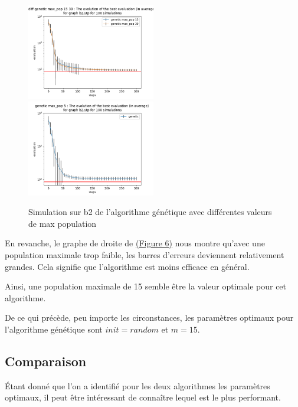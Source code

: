 \documentclass[11pt,french]{report}
\begin{document}
        \begin{figure}
          \includegraphics[width=0.5\textwidth]{best_b2_evaluation_diff genetic max_pop 15 30.png}
          \includegraphics[width=0.5\textwidth]{best_b2_evaluation_genetic max_pop 5.png}
          \caption{Simulation sur b2 de l'algorithme génétique avec différentes valeurs de max population}
          \label{Figure6}
        \end{figure}

        En revanche, le graphe de droite de \hyperref[Figure6]{(Figure 6)} nous montre qu'avec une population maximale trop faible, les barres d'erreurs deviennent relativement grandes. Cela signifie que l'algorithme est moins efficace en général.

        Ainsi, une population maximale de 15 semble être la valeur optimale pour cet algorithme.


        De ce qui précède, peu importe les circonstances, les paramètres optimaux pour l'algorithme génétique sont $init = random$ et $\hyperref[sélection]{m} = 15$.

        \subsection{Comparaison}
        Étant donné que l'on a identifié pour les deux algorithmes les paramètres optimaux, il peut être intéressant de connaître lequel est le plus performant.
\end{document}
